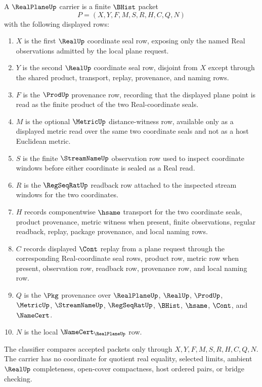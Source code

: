 \begin{definition}
\label{def:real-plane-carrier}
A $\RealPlaneUp$ carrier is a finite $\BHist$ packet
$$
P=(X,Y,F,M,S,R,H,C,Q,N)
$$
with the following displayed rows:
\begin{enumerate}
\item $X$ is the first $\RealUp$ coordinate seal row, exposing only the named Real observations admitted by the local plane request.
\item $Y$ is the second $\RealUp$ coordinate seal row, disjoint from $X$ except through the shared product, transport, replay, provenance, and naming rows.
\item $F$ is the $\ProdUp$ provenance row, recording that the displayed plane point is read as the finite product of the two Real-coordinate seals.
\item $M$ is the optional $\MetricUp$ distance-witness row, available only as a displayed metric read over the same two coordinate seals and not as a host Euclidean metric.
\item $S$ is the finite $\StreamNameUp$ observation row used to inspect coordinate windows before either coordinate is sealed as a Real read.
\item $R$ is the $\RegSeqRatUp$ readback row attached to the inspected stream windows for the two coordinates.
\item $H$ records componentwise $\hsame$ transport for the two coordinate seals, product provenance, metric witness when present, finite observations, regular readback, replay, package provenance, and local naming rows.
\item $C$ records displayed $\Cont$ replay from a plane request through the corresponding Real-coordinate seal rows, product row, metric row when present, observation row, readback row, provenance row, and local naming row.
\item $Q$ is the $\Pkg$ provenance over $\RealPlaneUp$, $\RealUp$, $\ProdUp$, $\MetricUp$, $\StreamNameUp$, $\RegSeqRatUp$, $\BHist$, $\hsame$, $\Cont$, and $\NameCert$.
\item $N$ is the local $\NameCert_{\RealPlaneUp}$ row.
\end{enumerate}
The classifier compares accepted packets only through $X,Y,F,M,S,R,H,C,Q,N$. The carrier has no coordinate for quotient real equality, selected limits, ambient $\RealUp$ completeness, open-cover compactness, host ordered pairs, or bridge checking.
\end{definition}


